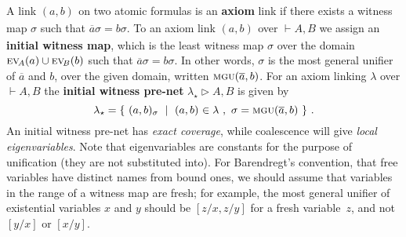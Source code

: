 \documentclass[a4paper,UKenglish]{lipics-v2019}
\makeatletter
\newcommand\defn[1]{\textbf{#1}}
\newcommand\ex[2][{}]{\textsc{ev}_{#1}(#2)}
\newcommand\+{+}
\renewcommand\*{\times}
\newcommand\dual[1]{\overline{#1}}
\newcommand\seq[2]{{\vdash}#1,#2}
\newcommand\Seq{\vphantom(\seq}
\newcommand\Prf[3]{\deduce{\Seq{#2}{#3}}{\vphantom(#1}}
\newcommand\net[3]{#1\triangleright #2,#3}
\newcommand\mgu{\textsc{mgu}}
\newcommand\coh{\smallfrown}
\newcommand\join{\vee}
\newcommand\init[2]{\mgu(#1,#2)}
\newcommand\link[3][\sigma]{(#2,#3)_{#1}}
\newcommand\ucoal{\rightsquigarrow}
\newcommand\srr[1]{
  \ifx#1+\expandafter\@srr\else
  \ifx#1*\*\mathrm S\else
  \ifx#1!\forall\mathrm S\else
  \ifx#1?\exists\mathrm S\else 
  \ifx#11\mathrm{axS}\else
  #1\mathrm S  \fi\fi\fi\fi\fi
}
\newcommand\@srr[1]{+\mathrm S,{#1}}
\newcommand\urr[1]{
  \ifx#1+\expandafter\@urr\else
  \ifx#1*\*\mathrm U\else
  \ifx#1!\forall\mathrm U\else
  \ifx#1?\exists\mathrm U\else 
  \ifx#11\mathrm{axU}\else
  #1\mathrm U
  \fi\fi\fi\fi\fi
}
\newcommand\@urr[1]{+\mathrm U,{#1}}
\makeatother
\begin{document}
A link $\link[]ab$ on two atomic formulas is an \defn{axiom} link if there exists a witness map $\sigma$ such that $\dual a\sigma=b\sigma$. To an axiom link $\link[]ab$ over $\seq AB$ we assign an \defn{initial witness map}, which is the least witness map $\sigma$ over the domain $\ex[\!A]a\cup\ex[\!B]b$ such that $\dual a\sigma=b\sigma$. In other words, $\sigma$ is the most general unifier of $\dual a$ and $b$, over the given domain, written $\init{\dual a}b$. For an axiom linking $\lambda$ over $\seq AB$ the \defn{initial witness pre-net} $\net{\lambda_\star}AB$ is given by
\[
	\lambda_\star = \{~\link ab~\mid~\link[]ab\in\lambda~,~\sigma=\init{\dual a}b~\}~.
\]
An initial witness pre-net has \emph{exact coverage}, while coalescence will give \emph{local eigenvariables}. Note that eigenvariables are constants for the purpose of unification (they are not substituted into). For Barendregt's convention, that free variables have distinct names from bound ones, we should assume that variables in the range of a witness map are fresh; for example, the most general unifier of existential variables $x$ and $y$ should be $[z/x,z/y]$ for a fresh variable~$z$, and not $[y/x]$ or $[x/y]$.



\end{document}
